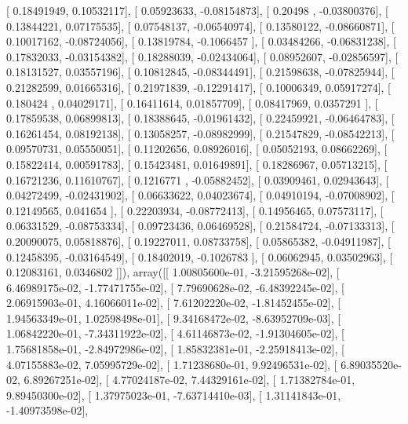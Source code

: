 \documentclass{article}
\begin{document}
       [ 0.18491949,  0.10532117],
       [ 0.05923633, -0.08154873],
       [ 0.20498   , -0.03800376],
       [ 0.13844221,  0.07175535],
       [ 0.07548137, -0.06540974],
       [ 0.13580122, -0.08660871],
       [ 0.10017162, -0.08724056],
       [ 0.13819784, -0.1066457 ],
       [ 0.03484266, -0.06831238],
       [ 0.17832033, -0.03154382],
       [ 0.18288039, -0.02434064],
       [ 0.08952607, -0.02856597],
       [ 0.18131527,  0.03557196],
       [ 0.10812845, -0.08344491],
       [ 0.21598638, -0.07825944],
       [ 0.21282599,  0.01665316],
       [ 0.21971839, -0.12291417],
       [ 0.10006349,  0.05917274],
       [ 0.180424  ,  0.04029171],
       [ 0.16411614,  0.01857709],
       [ 0.08417969,  0.0357291 ],
       [ 0.17859538,  0.06899813],
       [ 0.18388645, -0.01961432],
       [ 0.22459921, -0.06464783],
       [ 0.16261454,  0.08192138],
       [ 0.13058257, -0.08982999],
       [ 0.21547829, -0.08542213],
       [ 0.09570731,  0.05550051],
       [ 0.11202656,  0.08926016],
       [ 0.05052193,  0.08662269],
       [ 0.15822414,  0.00591783],
       [ 0.15423481,  0.01649891],
       [ 0.18286967,  0.05713215],
       [ 0.16721236,  0.11610767],
       [ 0.1216771 , -0.05882452],
       [ 0.03909461,  0.02943643],
       [ 0.04272499, -0.02431902],
       [ 0.06633622,  0.04023674],
       [ 0.04910194, -0.07008902],
       [ 0.12149565,  0.041654  ],
       [ 0.22203934, -0.08772413],
       [ 0.14956465,  0.07573117],
       [ 0.06331529, -0.08753334],
       [ 0.09723436,  0.06469528],
       [ 0.21584724, -0.07133313],
       [ 0.20090075,  0.05818876],
       [ 0.19227011,  0.08733758],
       [ 0.05865382, -0.04911987],
       [ 0.12458395, -0.03164549],
       [ 0.18402019, -0.1026783 ],
       [ 0.06062945,  0.03502963],
       [ 0.12083161,  0.0346802 ]]), array([[  1.00805600e-01,  -3.21595268e-02],
       [  6.46989175e-02,  -1.77471755e-02],
       [  7.79690628e-02,  -6.48392245e-02],
       [  2.06915903e-01,   4.16066011e-02],
       [  7.61202220e-02,  -1.81452455e-02],
       [  1.94563349e-01,   1.02598498e-01],
       [  9.34168472e-02,  -8.63952709e-03],
       [  1.06842220e-01,  -7.34311922e-02],
       [  4.61146873e-02,  -1.91304605e-02],
       [  1.75681858e-01,  -2.84972986e-02],
       [  1.85832381e-01,  -2.25918413e-02],
       [  4.07155883e-02,   7.05995729e-02],
       [  1.71238680e-01,   9.92496531e-02],
       [  6.89035520e-02,   6.89267251e-02],
       [  4.77024187e-02,   7.44329161e-02],
       [  1.71382784e-01,   9.89450300e-02],
       [  1.37975023e-01,  -7.63714410e-03],
       [  1.31141843e-01,  -1.40973598e-02],
\end{document}
